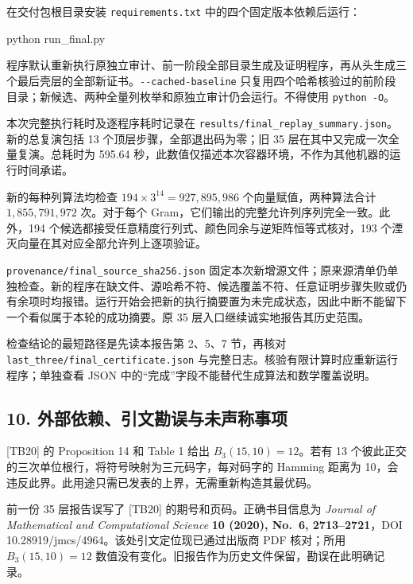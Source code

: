 \documentclass[
  11pt,
  a4paper,
]{article}
\newenvironment{Shaded}{}{}
\newcommand{\ExtensionTok}[1]{#1}
\newcommand{\NormalTok}[1]{#1}
\begin{document}
在交付包根目录安装 \texttt{requirements.txt}
中的四个固定版本依赖后运行：

\begin{Shaded}
\begin{Highlighting}[]
\ExtensionTok{python}\NormalTok{ run\_final.py}
\end{Highlighting}
\end{Shaded}

程序默认重新执行原独立审计、前一阶段全部目录生成及证明程序，再从头生成三个最后壳层的全部新证书。\texttt{-\/-cached-baseline}
只复用四个哈希核验过的前阶段目录；新候选、两种全量列枚举和原独立审计仍会运行。不得使用
\texttt{python\ -O}。

本次完整执行耗时及逐程序耗时记录在
\texttt{results/final\_replay\_summary.json}。新的总复演包括 13
个顶层步骤，全部退出码为零；旧 35 层在其中又完成一次全量复演。总耗时为
595.64 秒，此数值仅描述本次容器环境，不作为其他机器的运行时间承诺。

新的每种列算法均检查 \(194\times3^{14}=927,895,986\)
个向量赋值，两种算法合计 \(1,855,791,972\) 次。对于每个
Gram，它们输出的完整允许列序列完全一致。此外，194
个候选都接受任意精度行列式、颜色同余与逆矩阵恒等式核对，193
个湮灭向量在其对应全部允许列上逐项验证。

\texttt{provenance/final\_source\_sha256.json}
固定本次新增源文件；原来源清单仍单独检查。新的程序在缺文件、源哈希不符、候选覆盖不符、任意证明步骤失败或仍有余项时均报错。运行开始会把新的执行摘要置为未完成状态，因此中断不能留下一个看似属于本轮的成功摘要。原
35 层入口继续诚实地报告其历史范围。

检查结论的最短路径是先读本报告第 2、5、7 节，再核对
\texttt{last\_three/final\_certificate.json}
与完整日志。核验有限计算时应重新运行程序；单独查看 JSON
中的``完成''字段不能替代生成算法和数学覆盖说明。

\subsection{10.
外部依赖、引文勘误与未声称事项}\label{ux5916ux90e8ux4f9dux8d56ux5f15ux6587ux52d8ux8befux4e0eux672aux58f0ux79f0ux4e8bux9879}

{[}TB20{]} 的 Proposition 14 和 Table 1 给出 \(B_3(15,10)=12\)。若有 13
个彼此正交的三次单位根行，将符号映射为三元码字，每对码字的 Hamming
距离为 10，会违反此界。此用途只需已发表的上界，无需重新构造其最优码。

前一份 35 层报告误写了 {[}TB20{]} 的期号和页码。正确书目信息为
\emph{Journal of Mathematical and Computational Science} \textbf{10
(2020), No.~6, 2713--2721}，DOI
10.28919/jmcs/4964。该处引文定位现已通过出版商 PDF 核对；所用
\(B_3(15,10)=12\)
数值没有变化。旧报告作为历史文件保留，勘误在此明确记录。
\end{document}
